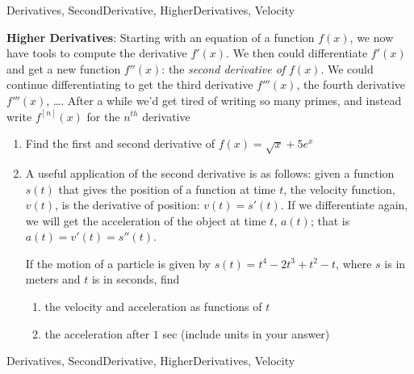 
\begin{tagblock}{Derivatives, SecondDerivative, HigherDerivatives, Velocity}
\begin{question}
	




\textbf{Higher Derivatives}: Starting with an equation of a function $f(x)$, we now have tools to compute the derivative $f'(x)$.  We then could differentiate $f'(x)$ and get a new function $f''(x)$: the \emph{second derivative of $f(x)$}.  We could continue differentiating to get the third derivative $f'''(x)$, the fourth derivative $f'''(x)$, \ldots.  After a while we'd get tired of writing so many primes, and instead write $f^{[n]}(x)$ for the $n^{th}$ derivative  
\begin{enumerate}
\item  Find the first and second derivative of $f(x) = \sqrt{x} + 5e^x$ 
\vspace{1.5in}
\item A useful application of the second derivative is as follows: given a function $s(t)$ that gives the position of a function at time $t$, the velocity function, $v(t)$, is the derivative of position: $v(t) = s'(t)$.  If we differentiate again, we will get the acceleration of the object at time $t$, $a(t)$; that is $a(t) = v'(t) = s''(t)$.  \\
\smallskip

If the motion of a particle is given by $s(t) = t^4 - 2t^3 +t^2 -t$, where $s$ is in meters and $t$ is in seconds, find
\begin{enumerate}
\item the velocity and acceleration as functions of $t$
\vspace{2in}

\item the acceleration after $1$ sec (include units in your answer)
\end{enumerate}


\end{enumerate}








	
	
\begin{tags}
	    Derivatives, SecondDerivative, HigherDerivatives, Velocity
\end{tags}
	
\begin{diary}
\end{diary}
	
\begin{solution}
	   
\end{solution}
	
\end{question}

\end{tagblock}

